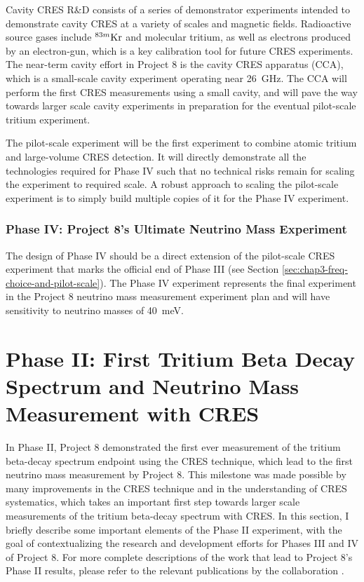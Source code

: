 Cavity CRES R\&D consists of a series of demonstrator experiments intended to demonstrate cavity CRES at a variety of scales and magnetic fields. Radioactive source gases include $^{83m}\rm{Kr}$ and molecular tritium, as well as electrons produced by an electron-gun, which is a key calibration tool for future CRES experiments. The near-term cavity effort in Project 8 is the cavity CRES apparatus (CCA), which is a small-scale cavity experiment operating near 26~GHz. The CCA will perform the first CRES measurements using a small cavity, and will pave the way towards larger scale cavity experiments in preparation for the eventual pilot-scale tritium experiment. 

The pilot-scale experiment will be the first experiment to combine atomic tritium and large-volume CRES detection. It will directly demonstrate all the technologies required for Phase IV such that no technical risks remain for scaling the experiment to required scale. A robust approach to scaling the pilot-scale experiment is to simply build multiple copies of it for the Phase IV experiment.

\subsubsection*{Phase IV: Project 8's Ultimate Neutrino Mass Experiment}

The design of Phase IV should be a direct extension of the pilot-scale CRES experiment that marks the official end of Phase III (see Section \ref{sec:chap3-freq-choice-and-pilot-scale}). The Phase IV experiment represents the final experiment in the Project 8 neutrino mass measurement experiment plan and will have sensitivity to neutrino masses of 40~meV. 

\section{Phase II: First Tritium Beta Decay Spectrum and Neutrino Mass Measurement with CRES}
\label{sec:chap3-phaseII}

In Phase II, Project 8 demonstrated the first ever measurement of the tritium beta-decay spectrum endpoint using the CRES technique, which lead to the first neutrino mass measurement by Project 8. This milestone was made possible by many improvements in the CRES technique and in the understanding of CRES systematics, which takes an important first step towards larger scale measurements of the tritium beta-decay spectrum with CRES. In this section, I briefly describe some important elements of the Phase II experiment, with the goal of contextualizing the research and development efforts for Phases III and IV of Project 8. For more complete descriptions of the work that lead to Project 8's Phase II results, please refer to the relevant publications by the collaboration \cite{p8prc2023,p8prl2023}.

